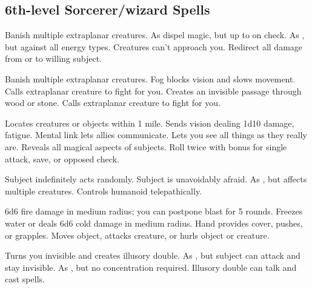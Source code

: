 \subsection{6th-level Sorcerer/wizard Spells} 
\begin{swspelllist}
   Banish multiple extraplanar creatures. 
   As dispel magic, but up to  on check.
   As , but against all energy types.
   Creatures can't approach you.
   Redirect all damage from or to willing subject.

   Banish multiple extraplanar creatures. 
   Fog blocks vision and slows movement.
   Calls extraplanar creature to fight for you.
   Creates an invisible passage through wood or stone.
   Calls extraplanar creature to fight for you.

   Locates creatures or objects within 1 mile.
   Sends vision dealing 1d10 damage, fatigue.
   Mental link lets allies communicate.
  \M Lets you see all things as they really are.
  \F  Reveals all magical aspects of subjects.
   Roll twice with bonus for single attack, save, or opposed check.

   Subject indefinitely acts randomly.
   Subject is unavoidably afraid.
   As , but affects multiple creatures.
   Controls humanoid telepathically.

   6d6 fire damage in medium radius; you can postpone blast for 5 rounds.
   Freezes water or deals 6d6 cold damage in medium radius.
   Hand provides cover, pushes, or grapples.
   Moves object, attacks creature, or hurls object or creature.

   Turns you invisible and creates illusory double.
   As , but subject can attack and stay invisible.
   As , but no concentration required.
   Illusory double can talk and cast spells.


\end{swspelllist}
